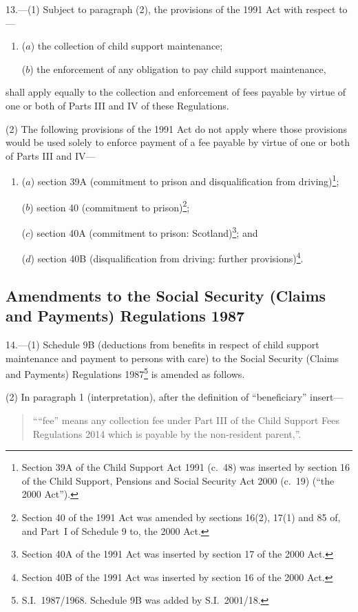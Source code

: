 \documentclass[12pt,a4paper]{article}
\begin{document}
13.—(1) Subject to paragraph (2), the provisions of the 1991 Act with respect to—
\begin{enumerate}\item[]
($a$) the collection of child support maintenance;

($b$) the enforcement of any obligation to pay child support maintenance,
\end{enumerate}
shall apply equally to the collection and enforcement of fees payable by virtue of one or both of Parts III and IV of these Regulations.

(2) The following provisions of the 1991 Act do not apply where those provisions would be used solely to enforce payment of a fee payable by virtue of one or both of Parts III and IV—
\begin{enumerate}\item[]
($a$) section 39A (commitment to prison and disqualification from driving)\footnote{Section 39A of the Child Support Act 1991 (c.~48) was inserted by section 16 of the Child Support, Pensions and Social Security Act 2000 (c.~19) (“the 2000 Act”).};

($b$) section 40 (commitment to prison)\footnote{Section 40 of the 1991 Act was amended by sections 16(2), 17(1) and 85 of, and Part~I of Schedule 9 to, the 2000 Act.};

($c$) section 40A (commitment to prison: Scotland)\footnote{Section 40A of the 1991 Act was inserted by section 17 of the 2000 Act.}; and

($d$) section 40B (disqualification from driving: further provisions)\footnote{Section 40B of the 1991 Act was inserted by section 16 of the 2000 Act.}.
\end{enumerate}

\subsection[14. Amendments to the Social Security (Claims and Payments) Regulations 1987]{Amendments to the Social Security (Claims and Payments) Regulations 1987}

14.—(1) Schedule 9B (deductions from benefits in respect of child support maintenance and payment to persons with care) to the Social Security (Claims and Payments) Regulations 1987\footnote{S.I.~1987/1968. Schedule 9B was added by S.I.~2001/18.} is amended as follows.

(2) In paragraph 1 (interpretation), after the definition of “beneficiary” insert—
\begin{quotation}
““fee” means any collection fee under Part III of the Child Support Fees Regulations 2014 which is payable by the non-resident parent,”.
\end{quotation}
\end{document}
